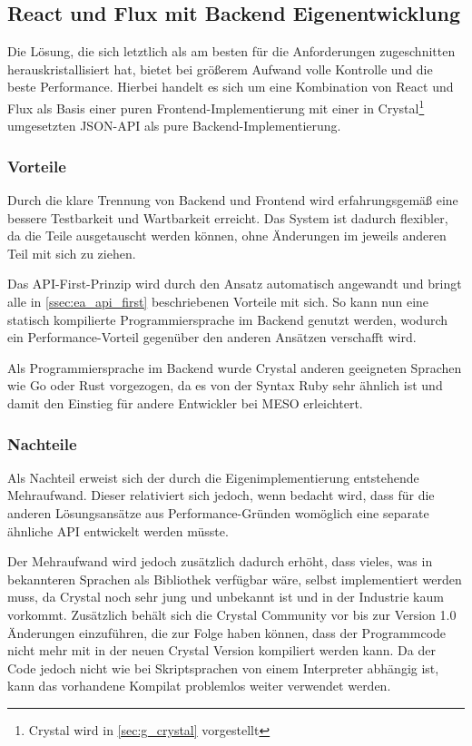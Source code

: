 \subsection{React und Flux mit Backend Eigenentwicklung}
\label{ssec:el_react_und_flux_mit_backend_eigenentwicklung}

Die Lösung, die sich letztlich als am besten für die Anforderungen zugeschnitten
herauskristallisiert hat, bietet bei größerem Aufwand volle Kontrolle und die
beste Performance.  Hierbei handelt es sich um eine Kombination von React und
Flux als Basis einer puren Frontend-Implementierung mit einer in
Crystal\footnote{Crystal wird in \cref{sec:g_crystal} vorgestellt} umgesetzten
JSON-API als pure Backend-Implementierung.

\subsubsection{Vorteile}
\label{sssec:ele_vorteile}

Durch die klare Trennung von Backend und Frontend wird erfahrungsgemäß eine
bessere Testbarkeit und Wartbarkeit erreicht.  Das System ist dadurch flexibler,
da die Teile ausgetauscht werden können, ohne Änderungen im jeweils anderen Teil
mit sich zu ziehen.

Das API-First-Prinzip wird durch den Ansatz automatisch angewandt und bringt
alle in \cref{ssec:ea_api_first} beschriebenen Vorteile mit sich.  So kann nun
eine statisch kompilierte Programmiersprache im Backend genutzt werden, wodurch
ein Performance-Vorteil gegenüber den anderen Ansätzen verschafft wird.

Als Programmiersprache im Backend wurde Crystal anderen geeigneten Sprachen wie
Go oder Rust vorgezogen, da es von der Syntax Ruby sehr ähnlich ist und damit
den Einstieg für andere Entwickler bei MESO erleichtert.

\subsubsection{Nachteile}
\label{sssec:ele_nachteile}

Als Nachteil erweist sich der durch die Eigenimplementierung entstehende
Mehraufwand.  Dieser relativiert sich jedoch, wenn bedacht wird, dass für die
anderen Lösungsansätze aus Performance-Gründen womöglich eine separate ähnliche
API entwickelt werden müsste.

Der Mehraufwand wird jedoch zusätzlich dadurch erhöht, dass vieles, was in
bekannteren Sprachen als Bibliothek verfügbar wäre, selbst implementiert werden
muss, da Crystal noch sehr jung und unbekannt ist und in der Industrie kaum
vorkommt.  Zusätzlich behält sich die Crystal Community vor bis zur Version 1.0
Änderungen einzuführen, die zur Folge haben können, dass der Programmcode nicht
mehr mit in der neuen Crystal Version kompiliert werden kann.  Da der Code
jedoch nicht wie bei Skriptsprachen von einem Interpreter abhängig ist, kann das
vorhandene Kompilat problemlos weiter verwendet werden.

